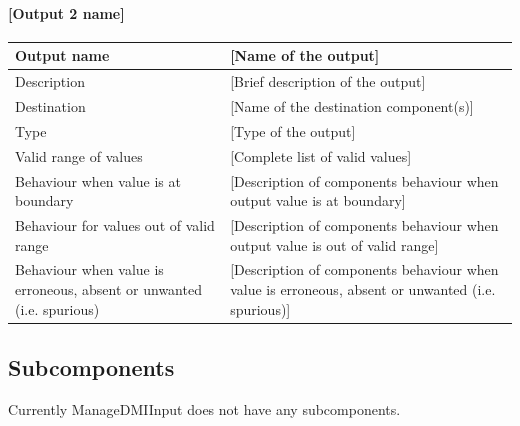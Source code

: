 \paragraph{[Output 2 name]}

\begin{longtable}{p{}p{}}
\toprule
Output name				& [Name of the output] \\
\midrule
Description				& [Brief description of the output] \\
\midrule
Destination				& [Name of the destination component(s)] \\ 
\midrule
Type					& [Type of the output] \\
\midrule
Valid range of values	& [Complete list of valid values] \\
\midrule
Behaviour when value is at boundary	& [Description of components behaviour when output value is at boundary] \\
\midrule
Behaviour for values out of valid range	& [Description of components behaviour when output value is out of valid range] \\
\midrule
Behaviour when value is erroneous, absent or unwanted (i.e. spurious) & [Description of components behaviour when value is erroneous, absent or unwanted (i.e. spurious)] \\
\bottomrule
\end{longtable}


\subsection{Subcomponents}\label{s:ManageDMIInput_subcomponents}

Currently ManageDMIInput does not have any subcomponents.

%

